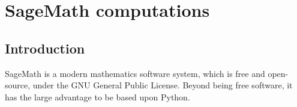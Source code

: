 \chapter{SageMath computations} \label{s:sam}

\minitoc

\section{Introduction}

SageMath is a modern mathematics software system, which is free and open-source,
under the GNU General Public License. Beyond being free software, it has
the large advantage to be based upon Python.

